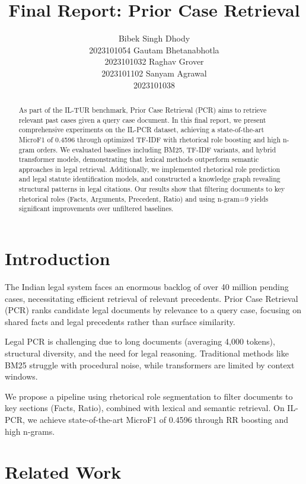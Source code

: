 \documentclass[11pt]{article}
\title{Final Report: Prior Case Retrieval}
\author{
  Bibek Singh Dhody \\ 2023101054 \And
  Gautam Bhetanabhotla \\ 2023101032 \And
  Raghav Grover \\ 2023101102 \And
  Sanyam Agrawal \\ 2023101038
}
\begin{document}
\maketitle

\begin{abstract}
As part of the IL-TUR benchmark, Prior Case Retrieval (PCR) aims to retrieve relevant past cases given a query case document.
In this final report, we present comprehensive experiments on the IL-PCR dataset, achieving a state-of-the-art MicroF1 of 0.4596 through optimized TF-IDF with rhetorical role boosting and high n-gram orders.
We evaluated baselines including BM25, TF-IDF variants, and hybrid transformer models, demonstrating that lexical methods outperform semantic approaches in legal retrieval.
Additionally, we implemented rhetorical role prediction and legal statute identification models, and constructed a knowledge graph revealing structural patterns in legal citations.
Our results show that filtering documents to key rhetorical roles (Facts, Arguments, Precedent, Ratio) and using n-gram=9 yields significant improvements over unfiltered baselines.
\end{abstract}

\section{Introduction}

The Indian legal system faces an enormous backlog of over 40 million pending cases, necessitating efficient retrieval of relevant precedents.
Prior Case Retrieval (PCR) ranks candidate legal documents by relevance to a query case, focusing on shared facts and legal precedents rather than surface similarity.

Legal PCR is challenging due to long documents (averaging 4,000 tokens), structural diversity, and the need for legal reasoning.
Traditional methods like BM25 struggle with procedural noise, while transformers are limited by context windows.

We propose a pipeline using rhetorical role segmentation to filter documents to key sections (Facts, Ratio), combined with lexical and semantic retrieval.
On IL-PCR, we achieve state-of-the-art MicroF1 of 0.4596 through RR boosting and high n-grams.

\section{Related Work}
\end{document}
